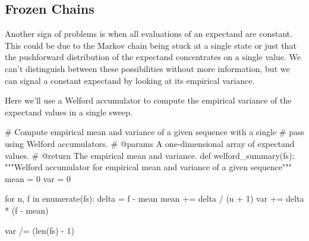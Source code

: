 \documentclass[
  letterpaper,
  DIV=11,
  numbers=noendperiod]{scrartcl}
\newenvironment{Shaded}{\begin{snugshade}}{\end{snugshade}}
\newcommand{\BuiltInTok}[1]{\textcolor[rgb]{0.00,0.23,0.31}{#1}}
\newcommand{\CommentTok}[1]{\textcolor[rgb]{0.37,0.37,0.37}{#1}}
\newcommand{\ControlFlowTok}[1]{\textcolor[rgb]{0.00,0.23,0.31}{#1}}
\newcommand{\DecValTok}[1]{\textcolor[rgb]{0.68,0.00,0.00}{#1}}
\newcommand{\KeywordTok}[1]{\textcolor[rgb]{0.00,0.23,0.31}{#1}}
\newcommand{\NormalTok}[1]{\textcolor[rgb]{0.00,0.23,0.31}{#1}}
\newcommand{\OperatorTok}[1]{\textcolor[rgb]{0.37,0.37,0.37}{#1}}
\begin{document}
\hypertarget{frozen-chains}{%
\subsection{Frozen Chains}\label{frozen-chains}}

Another sign of problems is when all evaluations of an expectand are
constant. This could be due to the Markov chain being stuck at a single
state or just that the pushforward distribution of the expectand
concentrates on a single value. We can't distinguish between these
possibilities without more information, but we can signal a constant
expectand by looking at its empirical variance.

Here we'll use a Welford accumulator to compute the empirical variance
of the expectand values in a single sweep.

\begin{Shaded}
\begin{Highlighting}[]

\CommentTok{\# Compute empirical mean and variance of a given sequence with a single}
\CommentTok{\# pass using Welford accumulators.}
\CommentTok{\# @params A one{-}dimensional array of expectand values.}
\CommentTok{\# @return The empirical mean and variance.}
\KeywordTok{def}\NormalTok{ welford\_summary(fs):}
  \CommentTok{"""Welford accumulator for empirical mean and variance of a}
\CommentTok{     given sequence"""}
\NormalTok{  mean }\OperatorTok{=} \DecValTok{0}
\NormalTok{  var }\OperatorTok{=} \DecValTok{0}
  
  \ControlFlowTok{for}\NormalTok{ n, f }\KeywordTok{in} \BuiltInTok{enumerate}\NormalTok{(fs):}
\NormalTok{    delta }\OperatorTok{=}\NormalTok{ f }\OperatorTok{{-}}\NormalTok{ mean}
\NormalTok{    mean }\OperatorTok{+=}\NormalTok{ delta }\OperatorTok{/}\NormalTok{ (n }\OperatorTok{+} \DecValTok{1}\NormalTok{)}
\NormalTok{    var }\OperatorTok{+=}\NormalTok{ delta }\OperatorTok{*}\NormalTok{ (f }\OperatorTok{{-}}\NormalTok{ mean)}
    
\NormalTok{  var }\OperatorTok{/=}\NormalTok{ (}\BuiltInTok{len}\NormalTok{(fs) }\OperatorTok{{-}} \DecValTok{1}\NormalTok{)}
  
\end{Highlighting}
\end{Shaded}
\end{document}
